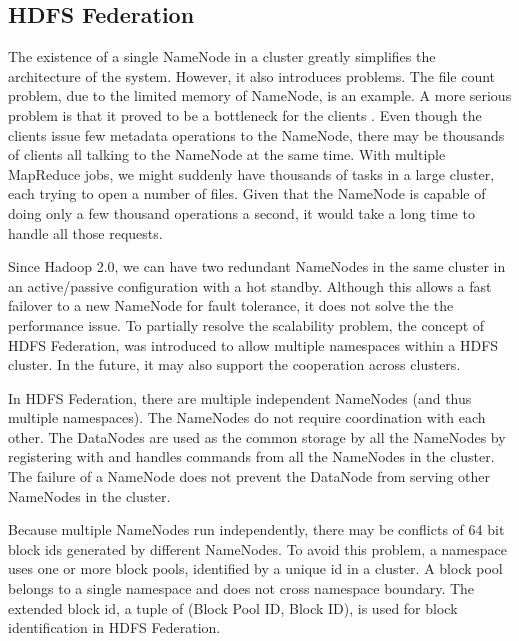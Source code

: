 \documentclass[12pt]{book}
\begin{document}
\subsection{HDFS Federation}
The existence of a single NameNode in a cluster greatly simplifies the architecture of the system. However, it also introduces problems. The file count problem, due to the limited memory of NameNode, is an example. A more serious problem is that it proved to be a bottleneck for the clients \cite{McKusick:2009:GEF}. Even though the clients issue few metadata operations to the NameNode, there may be thousands of clients all talking to the NameNode at the same time. With multiple MapReduce jobs, we might suddenly have thousands of tasks in a large cluster, each trying to open a number of files. Given that the NameNode is capable of doing only a few thousand operations a second, it would take a long time to handle all those requests.

Since Hadoop 2.0, we can have two redundant NameNodes in the same cluster in an active/passive configuration with a hot standby. Although this allows a fast failover to a new NameNode for fault tolerance, it does not solve the the performance issue. To partially resolve the scalability problem, the concept of HDFS Federation, was introduced to allow multiple namespaces within a HDFS cluster. In the future, it may also support the cooperation across clusters.

In HDFS Federation, there are multiple independent NameNodes (and thus multiple namespaces). The NameNodes do not require coordination with each other. The DataNodes are used as the common storage by all the NameNodes by registering with and handles commands from all the NameNodes in the cluster. The failure of a NameNode does not prevent the DataNode from serving other NameNodes in the cluster.

Because multiple NameNodes run independently, there may be conflicts of 64 bit block ids generated by different NameNodes. To avoid this problem, a namespace uses one or more block pools, identified by a unique id in a cluster. A block pool belongs to a single namespace and does not cross namespace boundary. The extended block id, a tuple of (Block Pool ID, Block ID), is used for block identification in HDFS Federation.
\end{document}
